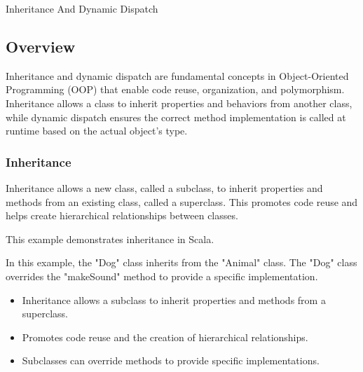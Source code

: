\begin{notes}{Inheritance And Dynamic Dispatch}
    \subsection*{Overview}

    Inheritance and dynamic dispatch are fundamental concepts in Object-Oriented Programming (OOP) that enable code reuse, organization, and polymorphism. Inheritance allows a class to inherit properties 
    and behaviors from another class, while dynamic dispatch ensures the correct method implementation is called at runtime based on the actual object's type.
    
    \subsubsection*{Inheritance}
    
    Inheritance allows a new class, called a subclass, to inherit properties and methods from an existing class, called a superclass. This promotes code reuse and helps create hierarchical relationships between classes.
    
    \begin{highlight}[Inheritance]
    
        This example demonstrates inheritance in Scala.
    
    
        In this example, the "Dog" class inherits from the "Animal" class. The "Dog" class overrides the "makeSound" method to provide a specific implementation.
    
        \begin{itemize}
            \item Inheritance allows a subclass to inherit properties and methods from a superclass.
            \item Promotes code reuse and the creation of hierarchical relationships.
            \item Subclasses can override methods to provide specific implementations.
        \end{itemize}
    

\end{highlight}
\end{notes}
